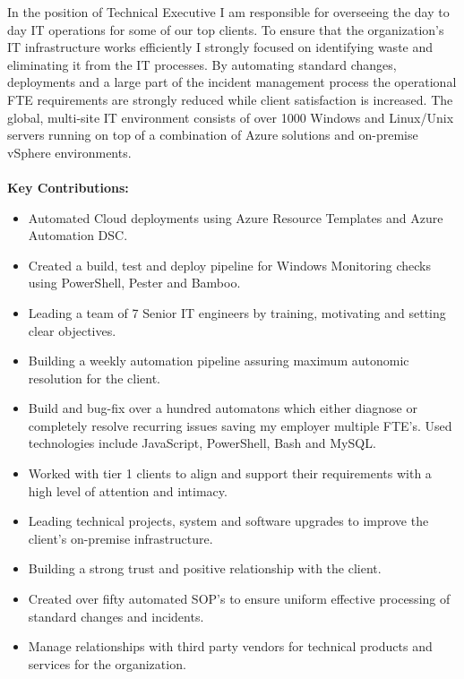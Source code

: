\vspace{2pt}
In the position of Technical Executive I am responsible for overseeing the day to day IT operations for some of our top clients. To ensure that the organization’s IT infrastructure works efficiently I strongly focused on identifying waste and eliminating it from the IT processes. By automating standard changes, deployments and a large part of the incident management process the operational FTE requirements are strongly reduced while client satisfaction is increased. The global, multi-site IT environment consists of over 1000 Windows and Linux/Unix servers running on top of a combination of Azure solutions and on-premise vSphere environments.\\
\\
\textbf{Key Contributions:}
\begin{itemize}
\item Automated Cloud deployments using Azure Resource Templates and Azure Automation DSC.
\item Created a build, test and deploy pipeline for Windows Monitoring checks using PowerShell, Pester and Bamboo.
\item Leading a team of 7 Senior IT engineers by training, motivating and setting clear objectives.
\item Building a weekly automation pipeline assuring maximum autonomic resolution for the client.
\item Build and bug-fix over a hundred automatons which either diagnose or completely resolve recurring issues saving my employer multiple FTE's. Used technologies include JavaScript, PowerShell, Bash and MySQL. 
\item Worked with tier 1 clients to align and support their requirements with a high level of attention and intimacy.
\item Leading technical projects, system and software upgrades to improve the client's on-premise infrastructure. 
\item Building a strong trust and positive relationship with the client.
\item Created over fifty automated SOP’s to ensure uniform effective processing of standard changes and incidents.
\item Manage relationships with third party vendors for technical products and services for the organization.\\
\end{itemize}

